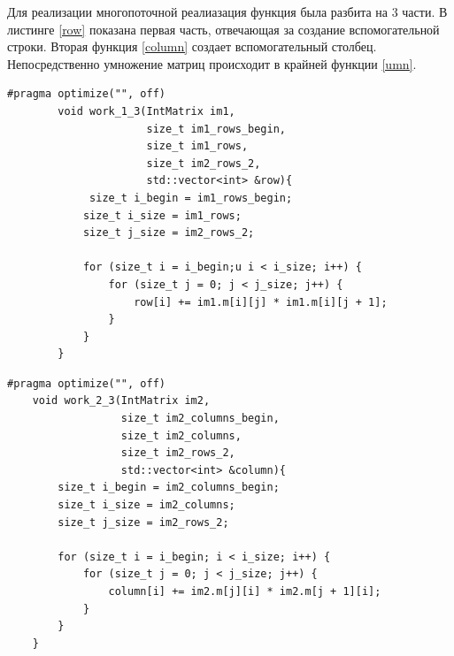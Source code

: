 \documentclass[a4paper, 14pt]{article}
\begin{document}
		Для реализации многопоточной реалиазация функция была разбита на 3 части. В листинге \ref{row} показана первая часть, отвечающая за создание вспомогательной строки. Вторая функция \ref{column} создает вспомогательный столбец. Непосредственно умножение матриц происходит в крайней функции \ref{umn}. 
	
	\begin{lstlisting}[label= row,caption=Создание вспомогательной строки]
      #pragma optimize("", off)
        void work_1_3(IntMatrix im1,
                      size_t im1_rows_begin,
                      size_t im1_rows, 
                      size_t im2_rows_2,
                      std::vector<int> &row){
             size_t i_begin = im1_rows_begin;
            size_t i_size = im1_rows;
            size_t j_size = im2_rows_2;
        
            for (size_t i = i_begin;u i < i_size; i++) {
                for (size_t j = 0; j < j_size; j++) {
                    row[i] += im1.m[i][j] * im1.m[i][j + 1];
                }
            }
        }
	\end{lstlisting}
	
		\begin{lstlisting}[label= column,caption=Создание вспомогательного столбца]
  #pragma optimize("", off)
    void work_2_3(IntMatrix im2,
                  size_t im2_columns_begin,
                  size_t im2_columns,
                  size_t im2_rows_2,
                  std::vector<int> &column){
        size_t i_begin = im2_columns_begin;
        size_t i_size = im2_columns;
        size_t j_size = im2_rows_2;
    
        for (size_t i = i_begin; i < i_size; i++) {
            for (size_t j = 0; j < j_size; j++) { 
                column[i] += im2.m[j][i] * im2.m[j + 1][i]; 
            }
        }
    }
	\end{lstlisting}
	
\end{document}
